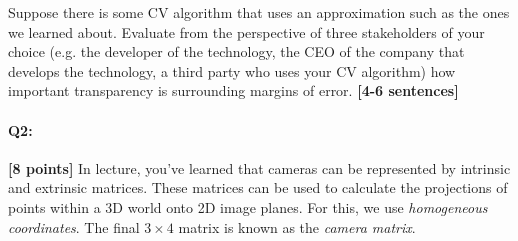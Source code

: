 \begin{enumerate}[(a)]
\begin{tcolorbox}[colback=orange!5!white,colframe=orange!75!black]
Suppose there is some CV algorithm that uses an approximation such as the ones we learned about. Evaluate from the perspective of three stakeholders of your choice (e.g. the developer of the technology, the CEO of the company that develops the technology, a third party who uses your CV algorithm) how important transparency is surrounding margins of error. \textbf{[4-6 sentences]}
\end{tcolorbox}


\end{enumerate}





\pagebreak
\paragraph{Q2:} \textbf{[8 points]}
In lecture, you've learned that cameras can be represented by intrinsic and extrinsic matrices. These matrices can be used to calculate the projections of points within a 3D world onto 2D image planes. For this, we use \emph{homogeneous coordinates}. The final $3\times4$ matrix is known as the \emph{camera matrix}.

